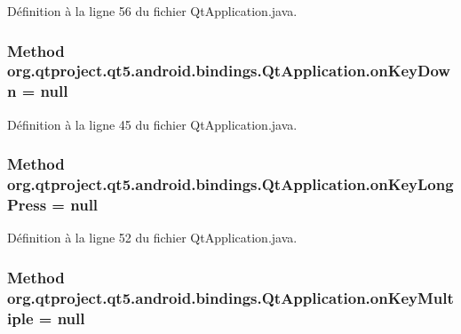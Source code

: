 Définition à la ligne 56 du fichier Qt\-Application.\-java.

\hypertarget{classorg_1_1qtproject_1_1qt5_1_1android_1_1bindings_1_1_qt_application_a399e0ef76371331edc6aca47b4936dc6}{
\subsubsection[{on\-Key\-Down}]{\setlength{\rightskip}{0pt plus 5cm}Method org.\-qtproject.\-qt5.\-android.\-bindings.\-Qt\-Application.\-on\-Key\-Down = null\hspace{0.3cm}{\ttfamily [static]}}}\label{classorg_1_1qtproject_1_1qt5_1_1android_1_1bindings_1_1_qt_application_a399e0ef76371331edc6aca47b4936dc6}


Définition à la ligne 45 du fichier Qt\-Application.\-java.

\hypertarget{classorg_1_1qtproject_1_1qt5_1_1android_1_1bindings_1_1_qt_application_abe105cb7eb9d98af229bcc706ad7660b}{
\subsubsection[{on\-Key\-Long\-Press}]{\setlength{\rightskip}{0pt plus 5cm}Method org.\-qtproject.\-qt5.\-android.\-bindings.\-Qt\-Application.\-on\-Key\-Long\-Press = null\hspace{0.3cm}{\ttfamily [static]}}}\label{classorg_1_1qtproject_1_1qt5_1_1android_1_1bindings_1_1_qt_application_abe105cb7eb9d98af229bcc706ad7660b}


Définition à la ligne 52 du fichier Qt\-Application.\-java.

\hypertarget{classorg_1_1qtproject_1_1qt5_1_1android_1_1bindings_1_1_qt_application_a7098736b29503c41026ff60cca904094}{
\subsubsection[{on\-Key\-Multiple}]{\setlength{\rightskip}{0pt plus 5cm}Method org.\-qtproject.\-qt5.\-android.\-bindings.\-Qt\-Application.\-on\-Key\-Multiple = null\hspace{0.3cm}{\ttfamily [static]}}}\label{classorg_1_1qtproject_1_1qt5_1_1android_1_1bindings_1_1_qt_application_a7098736b29503c41026ff60cca904094}



